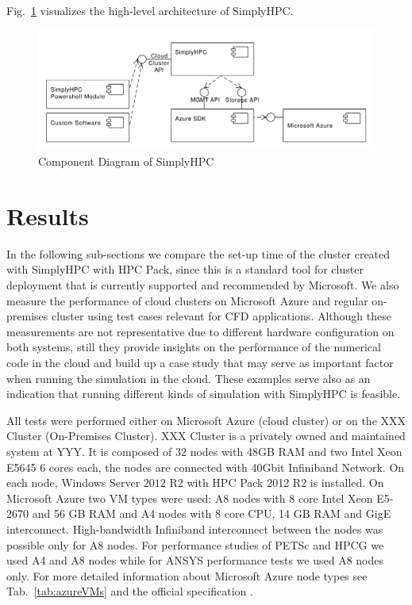 \documentclass[3p,times]{elsarticle}
\begin{document}
Fig.~\ref{fig:simplyHPCArch} visualizes the high-level architecture of SimplyHPC.

\begin{figure}[h]
\centering
	\includegraphics[width=.8\linewidth]{simplyHPCArch}
	\caption{Component Diagram of SimplyHPC}
	\label{fig:simplyHPCArch}
\end{figure}


\section{Results}
\label{sec:results}
In the following sub-sections we compare the set-up time of the cluster created with SimplyHPC with HPC Pack, since this is a standard tool for cluster deployment that is currently supported and recommended by Microsoft. We also measure the performance of cloud clusters on Microsoft Azure and regular on-premises cluster using test cases relevant for CFD applications. Although these measurements are not representative due to different hardware configuration on both systems, still they provide insights on the performance of the numerical code in the cloud and build up a case study that may serve as important factor when running the simulation in the cloud. These examples serve also as an indication that running different kinds of simulation with SimplyHPC is feasible. 

All tests were performed either on Microsoft Azure (cloud cluster) or on the 
XXX Cluster (On-Premises Cluster). 
XXX Cluster is a privately owned and maintained system at 
YYY. It is composed of $32$ nodes with 48GB RAM and two Intel Xeon E5645 6 cores each, the nodes are connected with 40Gbit Infiniband Network. On each node, Windows Server $2012$ R2 with HPC Pack 2012 R2 is installed.
On Microsoft Azure two VM types were used: A8 nodes with 8 core Intel Xeon E5-2670 and 56 GB RAM and A4 nodes with 8 core CPU, 14 GB RAM and GigE interconnect. High-bandwidth Infiniband interconnect between the nodes was possible only for A8 nodes. For performance studies of PETSc and HPCG we used A4 and A8 nodes while for ANSYS performance tests we used A8 nodes only. For more detailed information about Microsoft Azure node types see Tab.~\ref{tab:azureVMs} and the official specification \cite{azure}.
\end{document}
